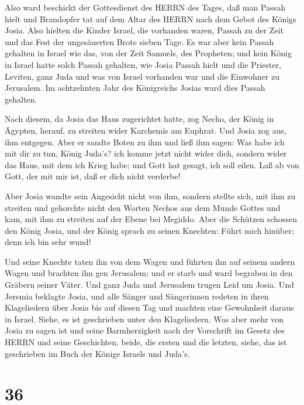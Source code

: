  Also ward beschickt der Gottesdienst des HERRN des Tages,
daß man Passah hielt und Brandopfer tat auf dem Altar des HERRN nach dem
Gebot des Königs Josia.  Also hielten die Kinder Israel,
die vorhanden waren, Passah zu der Zeit und das Fest der ungesäuerten
Brote sieben Tage.  Es war aber kein Passah gehalten in
Israel wie das, von der Zeit Samuels, des Propheten; und kein König in
Israel hatte solch Passah gehalten, wie Josia Passah hielt und die
Priester, Leviten, ganz Juda und was von Israel vorhanden war und die
Einwohner zu Jerusalem.  Im achtzehnten Jahr des
Königreichs Josias ward dies Passah gehalten.

 Nach diesem, da Josia das Haus zugerichtet hatte, zog
Necho, der König in Ägypten, herauf, zu streiten wider Karchemis am
Euphrat. Und Josia zog aus, ihm entgegen.  Aber er sandte
Boten zu ihm und ließ ihm sagen: Was habe ich mit dir zu tun, König
Juda's? ich komme jetzt nicht wider dich, sondern wider das Haus, mit
dem ich Krieg habe; und Gott hat gesagt, ich soll eilen. Laß ab von
Gott, der mit mir ist, daß er dich nicht verderbe!

 Aber Josia wandte sein Angesicht nicht von ihm, sondern
stellte sich, mit ihm zu streiten und gehorchte nicht den Worten Nechos
aus dem Munde Gottes und kam, mit ihm zu streiten auf der Ebene bei
Megiddo.  Aber die Schützen schossen den König Josia, und
der König sprach zu seinen Knechten: Führt mich hinüber; denn ich bin
sehr wund!

 Und seine Knechte taten ihn von dem Wagen und führten ihn
auf seinem andern Wagen und brachten ihn gen Jerusalem; und er starb und
ward begraben in den Gräbern seiner Väter. Und ganz Juda und Jerusalem
trugen Leid um Josia.  Und Jeremia beklagte Josia, und alle
Sänger und Sängerinnen redeten in ihren Klageliedern über Josia bis auf
diesen Tag und machten eine Gewohnheit daraus in Israel. Siehe, es ist
geschrieben unter den Klageliedern.  Was aber mehr von
Josia zu sagen ist und seine Barmherzigkeit nach der Vorschrift im
Gesetz des HERRN  und seine Geschichten, beide, die ersten
und die letzten, siehe, das ist geschrieben im Buch der Könige Israels
und Juda's.

\hypertarget{section-35}{%
\section{36}\label{section-35}}

